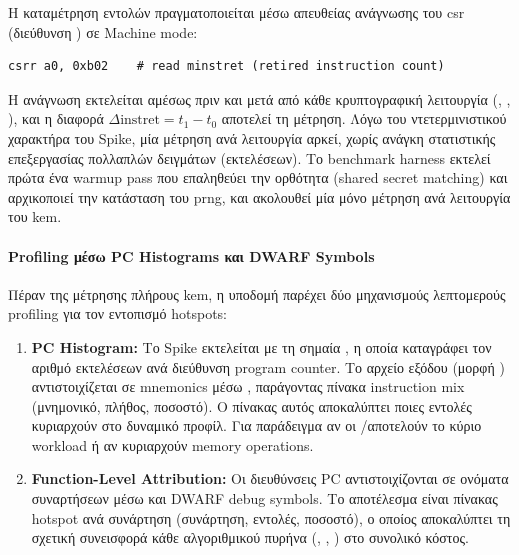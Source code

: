 Η καταμέτρηση εντολών πραγματοποιείται μέσω απευθείας ανάγνωσης του \gls{csr}
 (διεύθυνση ) σε Machine mode:

\begin{lstlisting}[language={[RISC-V]Assembler}, basicstyle=\ttfamily\small]
csrr a0, 0xb02    # read minstret (retired instruction count)
\end{lstlisting}

\noindent
Η ανάγνωση εκτελείται αμέσως πριν και μετά από κάθε κρυπτογραφική λειτουργία
(\KeyGen, \Encaps, \Decaps), και η διαφορά $\Delta\text{instret} = t_1 - t_0$
αποτελεί τη μέτρηση. Λόγω του ντετερμινιστικού χαρακτήρα του Spike, μία 
μέτρηση ανά λειτουργία αρκεί, χωρίς ανάγκη στατιστικής επεξεργασίας 
πολλαπλών δειγμάτων (εκτελέσεων). Το benchmark harness εκτελεί πρώτα 
ένα warmup pass που επαληθεύει την ορθότητα (shared secret matching) 
και αρχικοποιεί την κατάσταση του \gls{prng}, και ακολουθεί μία 
μόνο μέτρηση ανά λειτουργία του \gls{kem}.

\paragraph{Profiling μέσω PC Histograms και DWARF Symbols}

Πέραν της μέτρησης \instret πλήρους \gls{kem}, η υποδομή παρέχει δύο μηχανισμούς
λεπτομερούς profiling για τον εντοπισμό hotspots:

\begin{enumerate}
  \item \textbf{PC Histogram:} Το Spike εκτελείται με τη σημαία , η οποία
    καταγράφει τον αριθμό εκτελέσεων ανά διεύθυνση program counter. Το αρχείο
    εξόδου (μορφή ) αντιστοιχίζεται σε mnemonics μέσω
    , παράγοντας πίνακα instruction mix (μνημονικό, πλήθος,
    ποσοστό). Ο πίνακας αυτός αποκαλύπτει ποιες εντολές κυριαρχούν στο δυναμικό
    προφίλ. Για παράδειγμα αν οι \clmul/\clmulh αποτελούν το κύριο workload ή αν
    κυριαρχούν memory operations.

  \item \textbf{Function-Level Attribution:} Οι διευθύνσεις PC αντιστοιχίζονται σε
    ονόματα συναρτήσεων μέσω  και DWARF debug symbols. Το
    αποτέλεσμα είναι πίνακας hotspot ανά συνάρτηση (συνάρτηση, εντολές, ποσοστό),
    ο οποίος αποκαλύπτει τη σχετική συνεισφορά κάθε αλγοριθμικού πυρήνα
    (, , ) στο
    συνολικό κόστος.
\end{enumerate}

